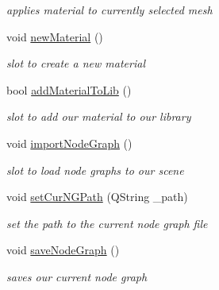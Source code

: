 \begin{DoxyCompactItemize}
\begin{DoxyCompactList}\small\item\em applies material to currently selected mesh \end{DoxyCompactList}\item 
\hypertarget{class_abstract_material_widget_ae3fc9533799259797b676f07d084211f}{void \hyperlink{class_abstract_material_widget_ae3fc9533799259797b676f07d084211f}{new\-Material} ()}\label{class_abstract_material_widget_ae3fc9533799259797b676f07d084211f}

\begin{DoxyCompactList}\small\item\em slot to create a new material \end{DoxyCompactList}\item 
\hypertarget{class_abstract_material_widget_ab4350dfde2aadd6e6c42210ec03a4dd1}{bool \hyperlink{class_abstract_material_widget_ab4350dfde2aadd6e6c42210ec03a4dd1}{add\-Material\-To\-Lib} ()}\label{class_abstract_material_widget_ab4350dfde2aadd6e6c42210ec03a4dd1}

\begin{DoxyCompactList}\small\item\em slot to add our material to our library \end{DoxyCompactList}\item 
\hypertarget{class_abstract_material_widget_ac4c17109d68c6540f5cfbcd3c409db3a}{void \hyperlink{class_abstract_material_widget_ac4c17109d68c6540f5cfbcd3c409db3a}{import\-Node\-Graph} ()}\label{class_abstract_material_widget_ac4c17109d68c6540f5cfbcd3c409db3a}

\begin{DoxyCompactList}\small\item\em slot to load node graphs to our scene \end{DoxyCompactList}\item 
void \hyperlink{class_abstract_material_widget_acf6a38c7f984df1eb5470780f1f8aa83}{set\-Cur\-N\-G\-Path} (Q\-String \-\_\-path)
\begin{DoxyCompactList}\small\item\em set the path to the current node graph file \end{DoxyCompactList}\item 
\hypertarget{class_abstract_material_widget_a314c224671ac3e3aa56d313eaa95398f}{void \hyperlink{class_abstract_material_widget_a314c224671ac3e3aa56d313eaa95398f}{save\-Node\-Graph} ()}\label{class_abstract_material_widget_a314c224671ac3e3aa56d313eaa95398f}

\begin{DoxyCompactList}\small\item\em saves our current node graph \end{DoxyCompactList}\end{DoxyCompactItemize}
